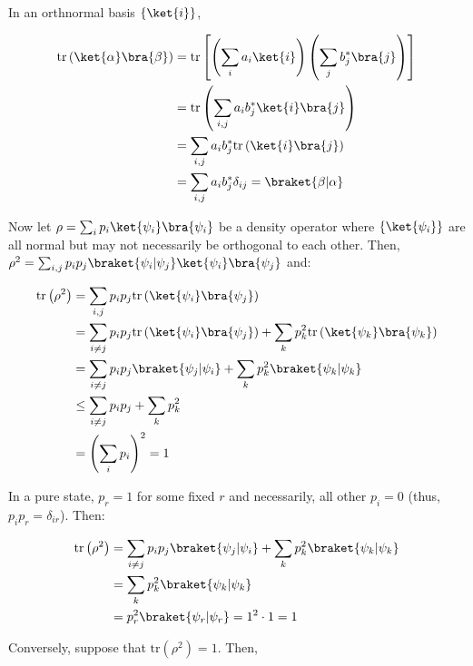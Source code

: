 \par In an orthnormal basis $\{\ket{i}\}$,

\begin{align}
\mathrm{tr} \left( \ket{\alpha} \bra{\beta} \right) &= \mathrm{tr} \left[ \left(
\sum_i{a_i \ket{i}} \right) \left( \sum_j{b_j^* \bra{j}} \right) \right] \\
&= \mathrm{tr} \left( \sum_{i, j}{a_i b_j^* \ket{i} \bra{j}} \right) \\
&= \sum_{i, j}{a_i b_j^* \mathrm{tr} \left( \ket{i} \bra{j} \right)} \\
&= \sum_{i, j}{a_i b_j^* \delta_{ij}} = \braket{\beta|\alpha}
\end{align}

\par Now let $\rho = \sum_i{p_i \ket{\psi_i} \bra{\psi_i}}$ be a density
operator where $\{\ket{\psi_i}\}$ are all normal but may not necessarily be
orthogonal to each other. Then, $\rho^2 = \sum_{i, j}{p_i p_j
\braket{\psi_i|\psi_j} \ket{\psi_i} \bra{\psi_j}}$ and:

\begin{align}
\mathrm{tr} \left( \rho^2 \right) &= \sum_{i, j}{p_i p_j \mathrm{tr} \left(
\ket{\psi_i} \bra{\psi_j} \right)} \\
&= \sum_{i \ne j}{p_i p_j \mathrm{tr} \left( \ket{\psi_i} \bra{\psi_j} \right)}
+ \sum_k{p_k^2 \mathrm{tr} \left( \ket{\psi_k} \bra{\psi_k} \right)} \\
&= \sum_{i \ne j}{p_i p_j \braket{\psi_j|\psi_i}} + \sum_k{p_k^2
\braket{\psi_k|\psi_k}} \\
&\le \sum_{i \ne j}{p_i p_j} + \sum_k{p_k^2} \\
&= \left( \sum_i{p_i} \right)^2 = 1
\end{align}

\par In a pure state, $p_r = 1$ for some fixed $r$ and necessarily, all other
$p_i = 0$ (thus, $p_i p_r = \delta_{ir}$). Then:

\begin{align}
\mathrm{tr} \left( \rho^2 \right) &= \sum_{i \ne j}{p_i p_j
\braket{\psi_j|\psi_i}} + \sum_k{p_k^2 \braket{\psi_k|\psi_k}} \\
&= \sum_k{p_k^2 \braket{\psi_k|\psi_k}} \\
&= p_r^2 \braket{\psi_r|\psi_r} = 1^2 \cdot 1 = 1
\end{align}

\par Conversely, suppose that $\mathrm{tr} \left( \rho^2 \right) = 1$. Then,

